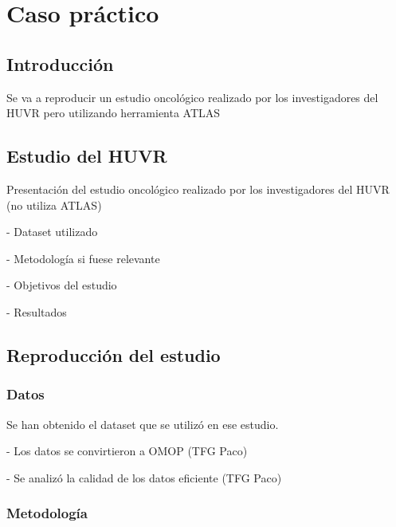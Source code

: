 \chapter{Caso práctico}\label{cap:08pruebas}

\section{Introducción}

Se va a reproducir un estudio oncológico realizado por los investigadores del HUVR pero utilizando herramienta ATLAS

\section{Estudio del HUVR}

Presentación del estudio oncológico realizado por los investigadores del HUVR  (no utiliza ATLAS)

- Dataset utilizado

- Metodología si fuese relevante

- Objetivos del estudio

- Resultados



\section{Reproducción del estudio}


\subsection{Datos}

Se han obtenido el dataset que se utilizó en ese estudio.

- Los datos se convirtieron a OMOP (TFG Paco)

- Se analizó la calidad de los datos eficiente (TFG Paco)

\subsection{Metodología}

